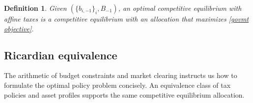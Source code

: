 \documentclass[thmsb,11pt]{article}
\newtheorem{definition}{Definition}
\begin{document}
\begin{definition}
\label{Def: optimal CE affine} Given $(\{b_{i,-1}\}_{i},B_{-1})$, an optimal
competitive equilibrium with affine taxes is a competitive equilibrium with an allocation that maximizes \eqref{govmt objective}.
\end{definition}
%
%
%
%

\color{black}

\subsection{Ricardian equivalence \label{sec:Ricardian101}}
The arithmetic of budget constraints and market clearing instructs us how to  formulate the optimal policy problem concisely.
An equivalence class of tax policies and asset profiles supports the same competitive equilibrium allocation.
\end{document}
